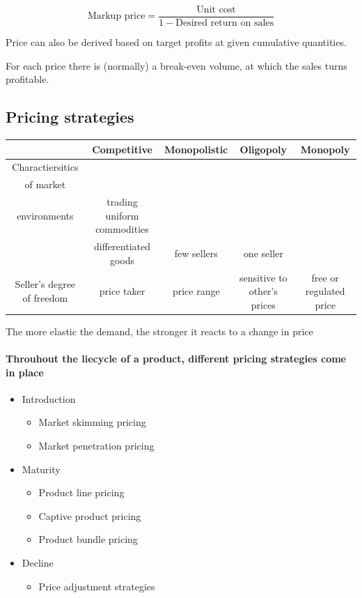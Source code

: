 \documentclass[a4paper,titlepage] {scrartcl}
\begin{document}
\begin{equation}
	\text{Markup price} = \frac{\text{Unit cost}}{1-\text{Desired return on sales}}
\end{equation}

Price can also be derived based on target profits at given cumulative quantities.

For each price there is (normally) a break-even volume, at which the sales turns profitable.

\subsection{Pricing strategies}
\begin{tabular}{ccccc}
\hline
 & Competitive & Monopolistic& Oligopoly & Monopoly\\
\hline
Charactiersitics\\of market\\environments & trading uniform commodities\\& differentiated goods & few sellers & one seller\\
\hline
Seller's degree of freedom & price taker & price range & sensitive to other's prices & free or regulated price\\
\hline
\end{tabular}

The more elastic the demand, the stronger it reacts to a change in price

\paragraph{Throuhout the liecycle of a product, different pricing strategies come in place} %
\label{par:throuhout_the_liecycle_of_a_product_different_pricing_strategies_come_in_place}
\begin{itemize}
	\item Introduction
	\begin{itemize}
		\item Market skimming pricing
		\item Market penetration pricing
	\end{itemize}
	\item Maturity
	\begin{itemize}
		\item Product line pricing
		\item Captive product pricing
		\item Product bundle pricing
	\end{itemize}
	\item Decline
	\begin{itemize}
		\item Price adjustment strategies
	\end{itemize}
\end{itemize}
\end{document}
